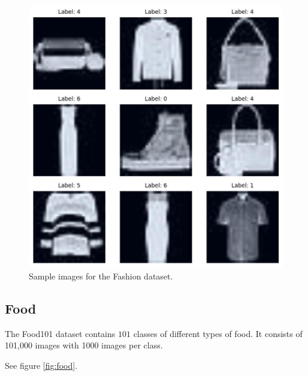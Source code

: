 \documentclass[letterpaper]{article} %
\theoremstyle{plain}
\theoremstyle{definition}
\theoremstyle{remark}
\begin{document}
\begin{figure}[htbp]
    \centering
    \includegraphics[width=\columnwidth]{../../images/fashion_1_sample.jpg}
    \caption{Sample images for the Fashion dataset.}
    \label{fig:fashion}
\end{figure}

\subsection{Food} The Food101 dataset \citep{food} contains $101$ classes of different types of food. It consists of 101,000 images with 1000 images per class. 

See figure \ref{fig:food}.
\end{document}
